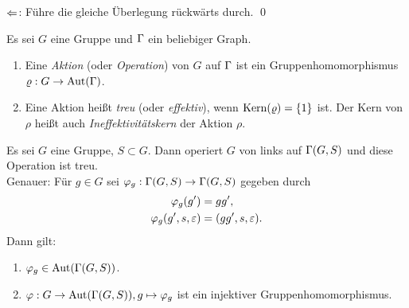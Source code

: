 \documentclass[a4paper, 12pt, twoside]{article}
\begin{document}
\glqq $\Leftarrow$\grqq: Führe die gleiche Überlegung rückwärts durch.
\qed

\DB Es sei $G$ eine Gruppe und $\Gamma$ ein beliebiger Graph.
\begin{enumerate}
\item Eine \emph{Aktion} (oder \emph{Operation}) von $G$ auf $\Gamma$ ist ein
Gruppenhomomorphismus $\varrho:G\rightarrow\mathrm{Aut}(\Gamma)$.
\item Eine Aktion heißt \emph{treu}
(oder \emph{effektiv}),
wenn $\mathrm{Kern}(\varrho)=\{1\}$ ist. Der Kern von $\rho$ heißt auch
\emph{Ineffektivitätskern}
der Aktion $\rho$.
\end{enumerate}

\BEM Es sei $G$ eine Gruppe, $S\subset G$. Dann operiert $G$ von
links auf $\Gamma(G,S)$ und diese Operation ist treu.\\
Genauer: Für $g\in G$ sei $\varphi_g:\Gamma(G,S)\rightarrow\Gamma(G,S)$ gegeben durch
\begin{align*}
\varphi_g(g') &= gg', \\
\varphi_g(g',s,\varepsilon) &= (gg',s,\varepsilon).
\end{align*}
Dann gilt:
\begin{enumerate}
\item $\varphi_g \in \mathrm{Aut}(\Gamma(G,S))$.
\item $\varphi:G\rightarrow\mathrm{Aut}(\Gamma(G,S)), g\mapsto \varphi_g$ ist ein injektiver
Gruppenhomomorphismus.
\end{enumerate}
\end{document}
